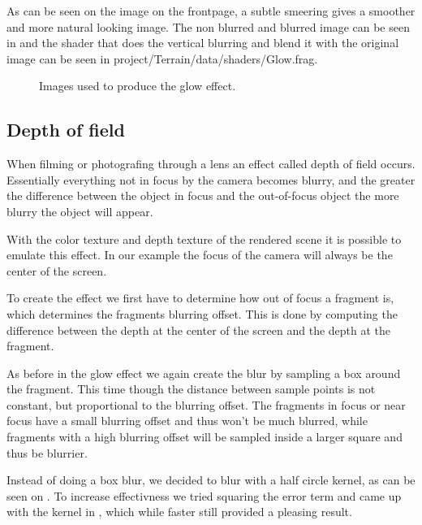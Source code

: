 As can be seen on the image on the frontpage, a subtle smeering gives
a smoother and more natural looking image. The non blurred and blurred
image can be seen in  and the shader that does the
vertical blurring and blend it with the original image can be seen in
project/Terrain/data/shaders/Glow.frag.

\begin{figure}
  \centering
  \caption{Images used to produce the glow effect.}
  \label{fig:glow}
\end{figure}


\subsection{Depth of field}

When filming or photografing through a lens an effect called depth of
field occurs. Essentially everything not in focus by the camera
becomes blurry, and the greater the difference between the object in
focus and the out-of-focus object the more blurry the object will
appear.

With the color texture and depth texture of the rendered scene it is
possible to emulate this effect. In our example the focus of the
camera will always be the center of the screen.

To create the effect we first have to determine how out of focus a
fragment is, which determines the fragments blurring offset. This is
done by computing the difference between the depth at the center of
the screen and the depth at the fragment.

As before in the glow effect we again create the blur by sampling a
box around the fragment. This time though the distance between sample
points is not constant, but proportional to the blurring offset. The
fragments in focus or near focus have a small blurring offset and thus
won't be much blurred, while fragments with a high blurring offset
will be sampled inside a larger square and thus be blurrier.

Instead of doing a box blur, we decided to blur with a half circle
kernel, as can be seen on . To increase
effectivness we tried squaring the error term and came up with the
kernel in , which while faster still provided
a pleasing result.

